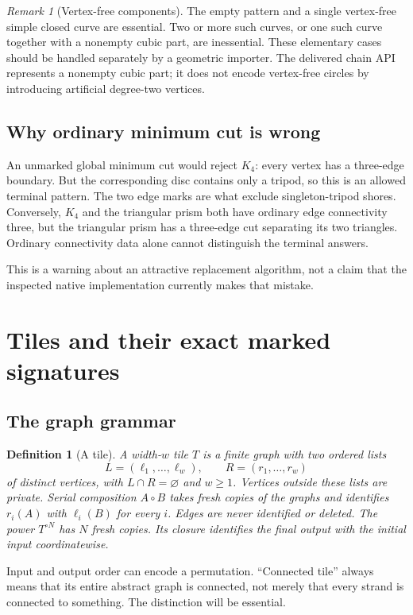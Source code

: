 \documentclass[11pt]{article}
\newtheorem{definition}[theorem]{Definition}
\theoremstyle{remark}\newtheorem{remark}[theorem]{Remark}
\begin{document}
\begin{remark}[Vertex-free components]
The empty pattern and a single vertex-free simple closed curve are essential. Two or more such curves, or one such curve together with a nonempty cubic part, are inessential. These elementary cases should be handled separately by a geometric importer. The delivered chain API represents a nonempty cubic part; it does not encode vertex-free circles by introducing artificial degree-two vertices.
\end{remark}

\subsection{Why ordinary minimum cut is wrong}
An unmarked global minimum cut would reject $K_4$: every vertex has a three-edge boundary. But the corresponding disc contains only a tripod, so this is an allowed terminal pattern. The two edge marks are what exclude singleton-tripod shores. Conversely, $K_4$ and the triangular prism both have ordinary edge connectivity three, but the triangular prism has a three-edge cut separating its two triangles. Ordinary connectivity data alone cannot distinguish the terminal answers.

This is a warning about an attractive replacement algorithm, not a claim that the inspected native implementation currently makes that mistake.

\section{Tiles and their exact marked signatures}
\subsection{The graph grammar}
\begin{definition}[A tile]
A width-$w$ tile $T$ is a finite graph with two ordered lists
\[
 L=(\ell_1,\ldots,\ell_w),\qquad R=(r_1,\ldots,r_w)
\]
of distinct vertices, with $L\cap R=\varnothing$ and $w\ge1$. Vertices outside these lists are private. Serial composition $A\circ B$ takes fresh copies of the graphs and identifies $r_i(A)$ with $\ell_i(B)$ for every $i$. Edges are never identified or deleted. The power $T^{\circ N}$ has $N$ fresh copies. Its closure identifies the final output with the initial input coordinatewise.
\end{definition}
Input and output order can encode a permutation. ``Connected tile'' always means that its entire abstract graph is connected, not merely that every strand is connected to something. The distinction will be essential.
\end{document}
